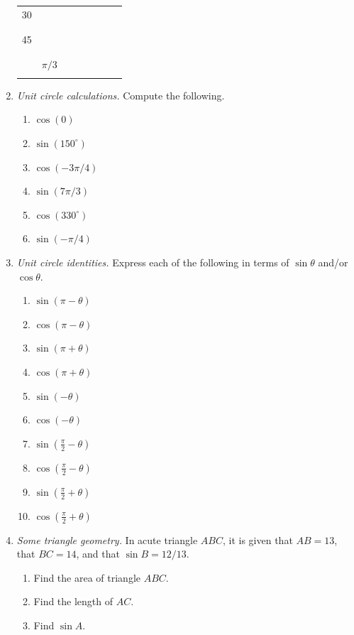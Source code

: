 \begin{enumerate}
\begin{center}
\begin{tabular}{c|c||c|c|c|c|c|c}
30 & & & & & & & \\
 & & & & & & & \\ \hline
 & & & & & & & \\
45 & & & & & & & \\
 & & & & & & & \\ \hline
 & & & & & & & \\
 & $\pi/3$ & & & & & & \\
 & & & & & & & 
\end{tabular}
\end{center}\newpage
\item \emph{Unit circle calculations.} Compute the following.
\begin{enumerate}
\item $\cos(0)$
\item $\sin(150^{\circ})$
\item $\cos(-3\pi/4)$
\item $\sin(7\pi/3)$
\item $\cos(330^{\circ})$
\item $\sin(-\pi/4)$
\end{enumerate}
\item \emph{Unit circle identities.} Express each of the following in terms of $\sin\theta$ and/or $\cos\theta$.
\begin{enumerate}
\item $\sin(\pi - \theta)$
\item $\cos(\pi - \theta)$
\item $\sin(\pi + \theta)$
\item $\cos(\pi + \theta)$
\item $\sin(-\theta)$
\item $\cos(-\theta)$
\item $\sin(\frac{\pi}{2} - \theta)$
\item $\cos(\frac{\pi}{2} - \theta)$
\item $\sin(\frac{\pi}{2} + \theta)$
\item $\cos(\frac{\pi}{2} + \theta)$
\end{enumerate}
\item \emph{Some triangle geometry.} In acute triangle $ABC$, it is given that $AB = 13$, that $BC = 14$, and that $\sin B = 12/13$.
\begin{enumerate}
\item Find the area of triangle $ABC$.
\item Find the length of $AC$.
\item Find $\sin A$.
\end{enumerate}
\end{enumerate}


